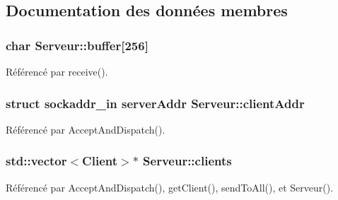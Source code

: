 \subsection{Documentation des données membres}
\hypertarget{classServeur_a8e6e5a2629cf14c4411b0fdae061444c}{
\subsubsection[{buffer}]{\setlength{\rightskip}{0pt plus 5cm}char Serveur\-::buffer\mbox{[}256\mbox{]}\hspace{0.3cm}{\ttfamily [private]}}}\label{classServeur_a8e6e5a2629cf14c4411b0fdae061444c}


Référencé par receive().

\hypertarget{classServeur_a326fa962e0672b4da2027f320d561e63}{
\subsubsection[{client\-Addr}]{\setlength{\rightskip}{0pt plus 5cm}struct sockaddr\-\_\-in server\-Addr Serveur\-::client\-Addr\hspace{0.3cm}{\ttfamily [private]}}}\label{classServeur_a326fa962e0672b4da2027f320d561e63}


Référencé par Accept\-And\-Dispatch().

\hypertarget{classServeur_a1c50d68dd630c95e89f0bb7467f818a6}{
\subsubsection[{clients}]{\setlength{\rightskip}{0pt plus 5cm}std\-::vector$<${\bf Client}$>$$\ast$ Serveur\-::clients\hspace{0.3cm}{\ttfamily [private]}}}\label{classServeur_a1c50d68dd630c95e89f0bb7467f818a6}


Référencé par Accept\-And\-Dispatch(), get\-Client(), send\-To\-All(), et Serveur().

